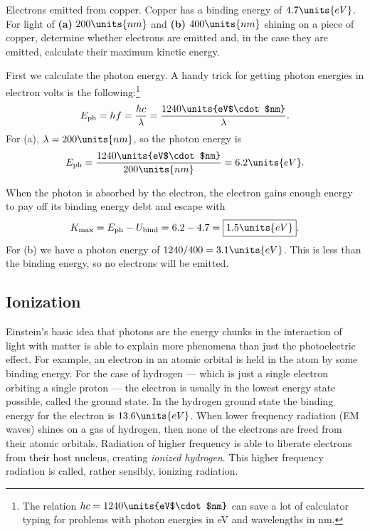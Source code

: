 \begin{example}{Electrons emitted from copper.}
Copper has a binding energy of $4.7\units{eV}$.  For light of {\bf
  (a)} $200\units{nm}$ and {\bf (b)} $400\units{nm}$ shining on a
piece of copper, determine whether electrons are emitted and, in the
case they are emitted, calculate their maximum kinetic energy.

\begin{solution}
First we calculate the photon energy.  A handy trick for
getting photon energies in electron volts is the
following:\footnote{The relation $hc=1240\units{eV$\cdot$nm}$ can save
  a lot of calculator typing for problems with photon energies in eV and
  wavelengths in nm.}
%
\begin{equation}
  E_\text{ph} = hf = \frac{hc}{\lambda}
  =\frac{1240\units{eV$\cdot$nm}}{\lambda}.
\end{equation}
%
For (a), $\lambda = 200\units{nm}$, so the photon energy is
%
\begin{equation}
  E_\text{ph}= \frac{1240\units{eV$\cdot$nm}}{200\units{nm}} =
  6.2\units{eV}.
\end{equation}

When the photon is absorbed by the electron, the electron gains enough
energy to pay off its binding energy debt and escape with
\begin{equation}
  K_\text{max} = E_\text{ph} - U_\text{bind} = 6.2 - 4.7 = 
\boxed{1.5\units{eV}}.
\end{equation}
For (b) we have a photon energy of $1240/400= 3.1\units{eV}$.  This
is less than the binding energy, so no electrons will be emitted.
\end{solution}
\end{example}

\subsection{Ionization}

Einstein's basic idea that photons are the energy chunks in the
interaction of light with matter is able to explain more phenomena
than just the photoelectric effect.  For example, an electron in an
atomic orbital is held in the atom by some binding energy.  For the
case of hydrogen --- which is just a single electron orbiting a single
proton --- the electron is usually in the lowest energy state
possible, called the ground state.  In the hydrogen ground state the
binding energy for the electron is $13.6\units{eV}$.  When lower
frequency radiation (EM waves) shines on a gas of hydrogen, then none
of the electrons are freed from their atomic orbitals.  Radiation of
higher frequency is able to liberate electrons from their host
nucleus, creating \textit{ionized hydrogen}.  This higher frequency
radiation is called, rather sensibly, ionizing radiation.

